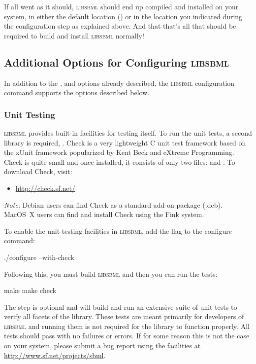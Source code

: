 \documentclass{sbmlmanual}
\newcommand{\libsbml}{\textsc{libsbml}}
\begin{document}
If all went as it should, \libsbml{} should end up compiled and installed
on your system, in either the default location () or in
the location you indicated during the configuration step as explained
above.  And that that's all that should be required to build and install
\libsbml{} normally!


\subsection{Additional Options for Configuring \libsbml{}}

In addition to the ,  and
 options already described, the \libsbml{}
configuration command supports the options described below.

\subsubsection{Unit Testing}

\libsbml{} provides built-in facilities for testing itself.  To run the
unit tests, a second library is required, .  Check is a
very lightweight C unit test framework based on the xUnit framework
popularized by Kent Beck and eXtreme Programming.  Check is quite small
and once installed, it consists of only two files:  and
.  To download Check, visit:

\begin{itemize}
  \item \url{http://check.sf.net/}
\end{itemize}

\emph{Note:} Debian users can find Check as a standard add-on package
(.deb).  MacOS~X users can find and install Check using the Fink system.

To enable the unit testing facilities in \libsbml{}, add the
 flag to the configure command:

\begin{example}[csh]
  ./configure --with-check
\end{example}

Following this, you must build \libsbml{} and then you can run the tests:

\begin{example}[csh]
  make
  make check
\end{example}

The  step is optional and will build and run an extensive
suite of unit tests to verify all facets of the library.  These tests are
meant primarily for developers of \libsbml{} and running them is not
required for the library to function properly.  All tests should pass with
no failures or errors.  If for some reason this is not the case on your
system, please submit a bug report using the facilities at
\url{http://www.sf.net/projects/sbml}.
\end{document}
